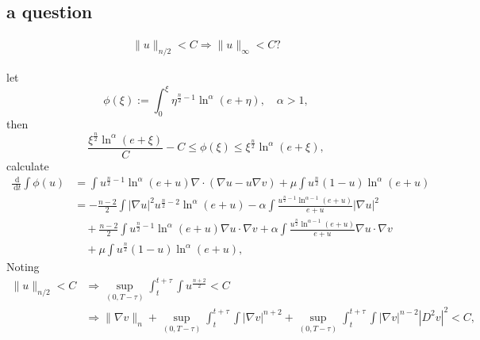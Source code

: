 \documentclass[en,hazy,screen,blue,14pt]{elegantnote}
\numberwithin{dummy}{section}
\newcommand{\dd}{\;\mathrm{d}}
\begin{document}
\subsection{a question}
\begin{align*}
	\|u\|_{n/2} < C \Rightarrow \|u\|_\infty < C ?
\end{align*}

let 
\[
	\phi(\xi):= \int_0^\xi \eta^{\frac{n}{2}-1}\ln^{\alpha}(e+\eta), \quad\alpha>1,
\]
then
\[
	\frac{\xi^{\frac{n}{2}}\ln^{\alpha}(e+\xi)}{C} - C 
	\leq \phi(\xi) 
	\leq \xi^{\frac{n}{2}}\ln^{\alpha}(e+\xi),
\]
calculate
\begin{align*}
	\frac{\dd}{\dd t}\int \phi(u) 
	&= \int u^{\frac{n}{2} - 1}\ln^{\alpha}(e+u) \nabla\cdot(\nabla u - u\nabla v)
		+ \mu\int u^{\frac{n}{2}}(1-u)\ln^{\alpha}(e+u)\\
	&= -\frac{n-2}{2}\int |\nabla u|^2u^{\frac{n}{2}-2}\ln^\alpha(e+u)
		- \alpha\int\frac{u^{\frac{n}{2}-1}\ln^{\alpha-1}(e+u)}{e+u}|\nabla u|^2\\
		&\quad + \frac{n-2}{2}\int u^{\frac{n}{2}-1}\ln^\alpha(e+u)\nabla u\cdot\nabla v 
			+ \alpha\int \frac{u^{\frac{n}{2}}\ln^{\alpha-1}(e+u)}{e+u} \nabla u \cdot \nabla v\\
		&\quad + \mu\int u^{\frac{n}{2}}(1-u)\ln^{\alpha}(e+u),
\end{align*}
Noting
\begin{align*}
	\|u\|_{n/2} < C 
	&\Rightarrow \sup_{(0,T-\tau)}\int_t^{t+\tau} \int u^{\frac{n+2}{2}} < C \\
	&\Rightarrow \|\nabla v\|_n 
		+ \sup_{(0,T-\tau)}\int_t^{t+\tau}\int |\nabla v|^{n+2}
		+ \sup_{(0,T-\tau)}\int_t^{t+\tau}\int  |\nabla v|^{n-2}|D^2v|^2 < C,
\end{align*}
\end{document}
